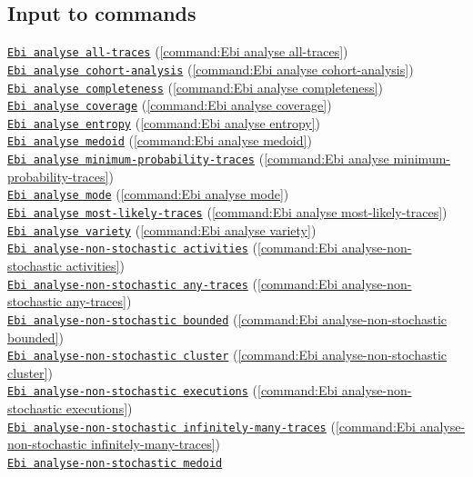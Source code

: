 {\subsection*{Input to commands} \null\qquad\hyperref[command:Ebi analyse all-traces]{\texttt{Ebi analyse all-traces}} (\cref{command:Ebi analyse all-traces})\\\null\qquad\hyperref[command:Ebi analyse cohort-analysis]{\texttt{Ebi analyse cohort-analysis}} (\cref{command:Ebi analyse cohort-analysis})\\\null\qquad\hyperref[command:Ebi analyse completeness]{\texttt{Ebi analyse completeness}} (\cref{command:Ebi analyse completeness})\\\null\qquad\hyperref[command:Ebi analyse coverage]{\texttt{Ebi analyse coverage}} (\cref{command:Ebi analyse coverage})\\\null\qquad\hyperref[command:Ebi analyse entropy]{\texttt{Ebi analyse entropy}} (\cref{command:Ebi analyse entropy})\\\null\qquad\hyperref[command:Ebi analyse medoid]{\texttt{Ebi analyse medoid}} (\cref{command:Ebi analyse medoid})\\\null\qquad\hyperref[command:Ebi analyse minimum-probability-traces]{\texttt{Ebi analyse minimum-probability-traces}} (\cref{command:Ebi analyse minimum-probability-traces})\\\null\qquad\hyperref[command:Ebi analyse mode]{\texttt{Ebi analyse mode}} (\cref{command:Ebi analyse mode})\\\null\qquad\hyperref[command:Ebi analyse most-likely-traces]{\texttt{Ebi analyse most-likely-traces}} (\cref{command:Ebi analyse most-likely-traces})\\\null\qquad\hyperref[command:Ebi analyse variety]{\texttt{Ebi analyse variety}} (\cref{command:Ebi analyse variety})\\\null\qquad\hyperref[command:Ebi analyse-non-stochastic activities]{\texttt{Ebi analyse-non-stochastic activities}} (\cref{command:Ebi analyse-non-stochastic activities})\\\null\qquad\hyperref[command:Ebi analyse-non-stochastic any-traces]{\texttt{Ebi analyse-non-stochastic any-traces}} (\cref{command:Ebi analyse-non-stochastic any-traces})\\\null\qquad\hyperref[command:Ebi analyse-non-stochastic bounded]{\texttt{Ebi analyse-non-stochastic bounded}} (\cref{command:Ebi analyse-non-stochastic bounded})\\\null\qquad\hyperref[command:Ebi analyse-non-stochastic cluster]{\texttt{Ebi analyse-non-stochastic cluster}} (\cref{command:Ebi analyse-non-stochastic cluster})\\\null\qquad\hyperref[command:Ebi analyse-non-stochastic executions]{\texttt{Ebi analyse-non-stochastic executions}} (\cref{command:Ebi analyse-non-stochastic executions})\\\null\qquad\hyperref[command:Ebi analyse-non-stochastic infinitely-many-traces]{\texttt{Ebi analyse-non-stochastic infinitely-many-traces}} (\cref{command:Ebi analyse-non-stochastic infinitely-many-traces})\\\null\qquad\hyperref[command:Ebi analyse-non-stochastic medoid]{\texttt{Ebi analyse-non-stochastic medoid}} }
